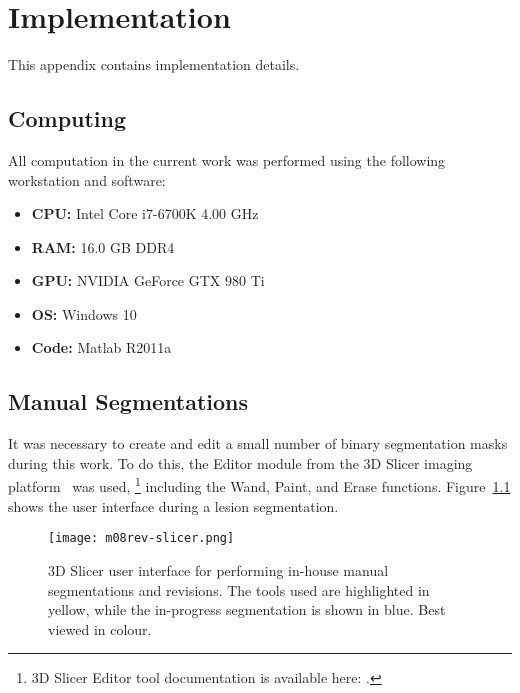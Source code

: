 \chapter{Implementation}
This appendix contains implementation details.
\section{Computing}
All computation in the current work was performed using the following workstation and software:
\begin{itemize}[topsep=0pt,itemsep=-6pt]
  \item \textbf{CPU:} Intel Core i7-6700K 4.00 GHz
  \item \textbf{RAM:} 16.0 GB DDR4
  \item \textbf{GPU:} NVIDIA GeForce GTX 980 Ti
  \item \textbf{OS:} Windows 10
  \item \textbf{Code:} Matlab R2011a
\end{itemize}
\section{Manual Segmentations}
It was necessary to create and edit a small number of binary segmentation masks during this work.
To do this, the Editor module from the 3D Slicer imaging platform~\cite{Fedorov2012} was used,%
\footnote{3D Slicer Editor tool documentation is available here:
  .}
including the Wand, Paint, and Erase functions.
Figure~\ref{fig:m08-rev-slicer} shows the user interface during a lesion segmentation.
\begin{figure}[h]
  \centering
  \texttt{[image: m08rev-slicer.png]}
  \caption{3D Slicer user interface for performing in-house manual segmentations and revisions.
    The tools used are highlighted in yellow, while the in-progress segmentation is shown in blue.
    Best viewed in colour.}%
  \label{fig:m08-rev-slicer}
\end{figure}
